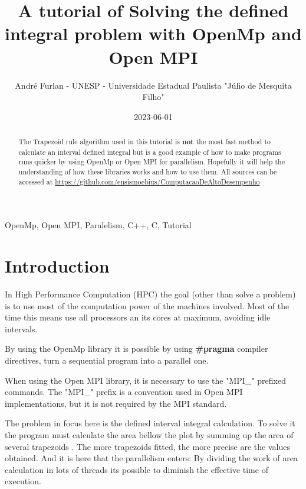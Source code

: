 


	\title{A tutorial of Solving the defined integral problem with OpenMp and Open MPI}
	\author{André Furlan - UNESP - Universidade Estadual Paulista "Júlio de Mesquita Filho"}
	\date{2023-06-01}
	\maketitle
	
	\begin{abstract}
		The Trapezoid rule algorithm used in this tutorial is \textbf{not} the most fast method to calculate an interval defined integral but is a good example of how to make programs runs quicker by using OpenMp or Open MPI for parallelism. Hopefully it will help the understanding of how these libraries works and how to use them. All sources can be accessed at \href{https://github.com/ensismoebius/ComputacaoDeAltoDesempenho}{https://github.com/ensismoebius/ComputacaoDeAltoDesempenho}
	\end{abstract}
	
	\begin{IEEEkeywords}
		OpenMp, Open MPI, Paralelism, C++, C, Tutorial
	\end{IEEEkeywords}
	
	\section{Introduction}
	\par In High Performance Computation (HPC) the goal (other than solve a problem) is to use most of the computation power of the machines involved. Most of the time this means use all processors an its cores at maximum, avoiding idle intervals.
	\par By using the OpenMp \cite{openmp08} library it is possible by using \textbf{\#pragma} compiler directives, turn a sequential program into a parallel one. 
	
	\par When using the Open MPI library, \cite{mpi40} it is necessary to use the "MPI\_" prefixed commands. The "MPI\_" prefix is a convention used in Open MPI implementations, but it is not required by the MPI standard.
	
	\par The problem in focus here is the defined interval integral calculation. To solve it the program must calculate the area bellow the plot by summing up the area of several trapezoids \cite{hildebrand1987introduction}. The more trapezoids fitted, the more precise are the values obtained. And it is here that the parallelism enters: By dividing the work of area calculation in lots of threads its possible to diminish the effective time of execution.
	
